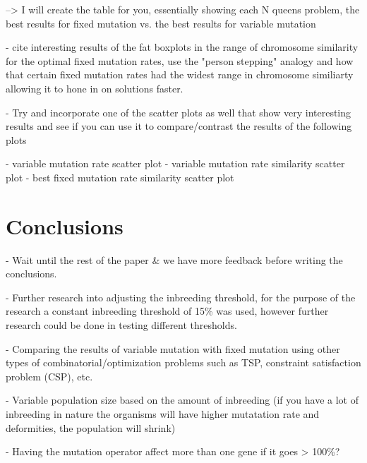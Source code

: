\documentclass{sig-alternate}
\begin{document}
  --> I will create the table for you, essentially showing each N queens problem, the
      best results for fixed mutation vs. the best results for variable mutation

- cite interesting results of the fat boxplots in the range of chromosome similarity
  for the optimal fixed mutation rates, use the "person stepping" analogy and how
  that certain fixed mutation rates had the widest range in chromosome similiarty
  allowing it to hone in on solutions faster.

- Try and incorporate one of the scatter plots as well that show very interesting
  results and see if you can use it to compare/contrast the results of the 
  following plots
  
    - variable mutation rate scatter plot
    - variable mutation rate similarity scatter plot
    - best fixed mutation rate similarity scatter plot




% 
%
\section{Conclusions}

- Wait until the rest of the paper \& we have more feedback before
  writing the conclusions.

- Further research into adjusting the inbreeding threshold, for the purpose
  of the research a constant inbreeding threshold of 15\% was used, however
  further research could be done in testing different thresholds.

- Comparing the results of variable mutation with fixed mutation using other
  types of combinatorial/optimization problems such as TSP, constraint
  satisfaction problem (CSP), etc.

- Variable population size based on the amount of inbreeding (if you have
  a lot of inbreeding in nature the organisms will have higher mutatation
  rate and deformities, the population will shrink)

- Having the mutation operator affect more than one gene if it goes > 100\%? 

\begin{flushleft}\end{flushleft}


\end{document}
